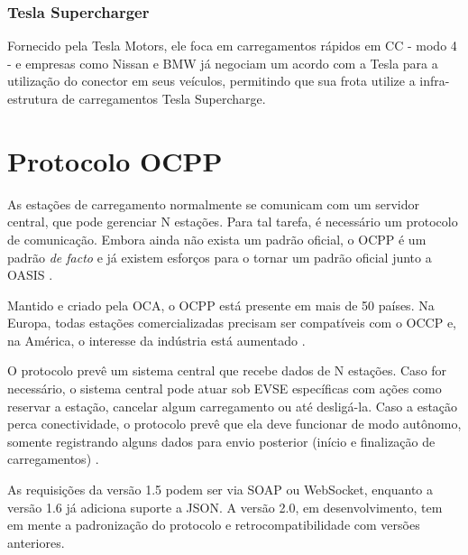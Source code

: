       \subsubsection{Tesla Supercharger}

        Fornecido pela Tesla Motors, ele foca em carregamentos rápidos em \ac{CC} - modo 4 - e empresas como Nissan e BMW já negociam um acordo com a Tesla para a utilização do conector em seus veículos, permitindo que sua frota utilize a infra-estrutura de carregamentos Tesla Supercharge.

  \section{Protocolo OCPP}

    As estações de carregamento normalmente se comunicam com um servidor central, que pode gerenciar N estações. Para tal tarefa, é necessário um protocolo de comunicação. Embora ainda não exista um padrão oficial, o \ac{OCPP} é um padrão \textit{de facto} e já existem esforços para o tornar um padrão oficial junto a \ac{OASIS} \cite{ocpp-news-standardization}.

    Mantido e criado pela \ac{OCA}, o OCPP está presente em mais de 50 países. Na Europa, todas estações comercializadas precisam ser compatíveis com o OCCP e, na América, o interesse da indústria está aumentado \cite{ocpp-news-forbes}.

    O protocolo prevê um sistema central que recebe dados de N estações. Caso for necessário, o sistema central pode atuar sob \ac{EVSE} específicas com ações como reservar a estação, cancelar algum carregamento ou até desligá-la. Caso a estação perca conectividade, o protocolo prevê que ela deve funcionar de modo autônomo, somente registrando alguns dados para envio posterior (início e finalização de carregamentos) \cite{ocpp-spec-15}.

    As requisições da versão 1.5 podem ser via SOAP ou WebSocket, enquanto a versão 1.6 já adiciona suporte a JSON. A versão 2.0, em desenvolvimento, tem em mente a padronização do protocolo e retrocompatibilidade com versões anteriores.
